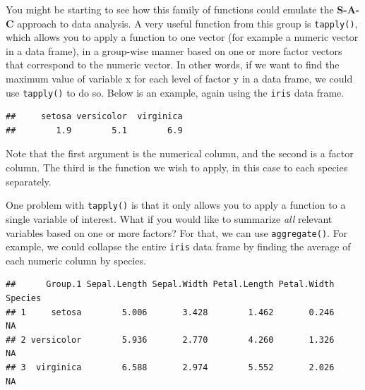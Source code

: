 \documentclass[
]{book}
\newenvironment{Shaded}{\begin{snugshade}}{\end{snugshade}}
\newcommand{\AttributeTok}[1]{\textcolor[rgb]{0.77,0.63,0.00}{#1}}
\newcommand{\DocumentationTok}[1]{\textcolor[rgb]{0.56,0.35,0.01}{\textbf{\textit{#1}}}}
\newcommand{\FunctionTok}[1]{\textcolor[rgb]{0.00,0.00,0.00}{#1}}
\newcommand{\NormalTok}[1]{#1}
\newcommand{\SpecialCharTok}[1]{\textcolor[rgb]{0.00,0.00,0.00}{#1}}
\begin{document}
You might be starting to see how this family of functions could emulate the \textbf{S-A-C} approach to data analysis. A very useful function from this group is \texttt{tapply()}, which allows you to apply a function to one vector (for example a numeric vector in a data frame), in a group-wise manner based on one or more factor vectors that correspond to the numeric vector. In other words, if we want to find the maximum value of variable x for each level of factor y in a data frame, we could use \texttt{tapply()} to do so. Below is an example, again using the \texttt{iris} data frame.

\begin{Shaded}
\end{Shaded}

\begin{verbatim}
##     setosa versicolor  virginica 
##        1.9        5.1        6.9
\end{verbatim}

Note that the first argument is the numerical column, and the second is a factor column. The third is the function we wish to apply, in this case to each species separately.

One problem with \texttt{tapply()} is that it only allows you to apply a function to a single variable of interest. What if you would like to summarize \emph{all} relevant variables based on one or more factors? For that, we can use \texttt{aggregate()}. For example, we could collapse the entire \texttt{iris} data frame by finding the average of each numeric column by species.

\begin{Shaded}
\end{Shaded}

\begin{verbatim}
##      Group.1 Sepal.Length Sepal.Width Petal.Length Petal.Width Species
## 1     setosa        5.006       3.428        1.462       0.246      NA
## 2 versicolor        5.936       2.770        4.260       1.326      NA
## 3  virginica        6.588       2.974        5.552       2.026      NA
\end{verbatim}
\end{document}
